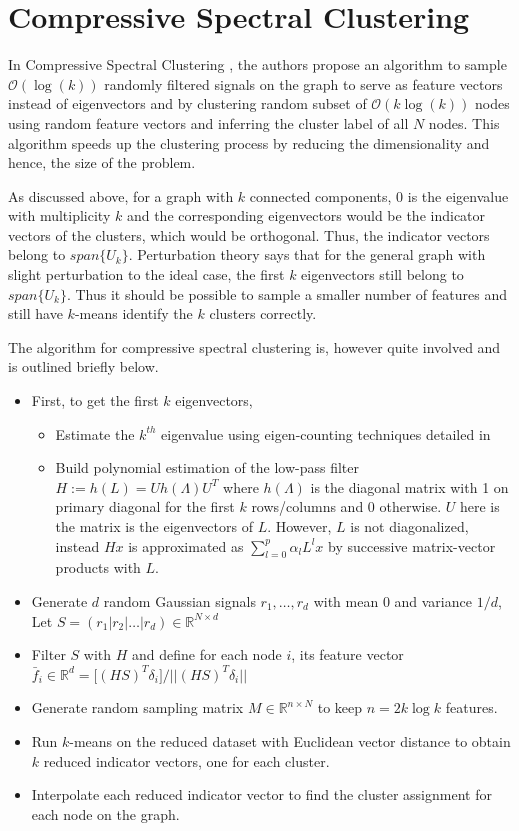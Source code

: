 \documentclass[10pt,a4paper, nocenter]{report}
\newcommand{\norm}[1]{\lvert\lvert {#1} \rvert\rvert}
\begin{document}
    \section{Compressive Spectral Clustering}
    In Compressive Spectral Clustering \cite{tremblay-compressive-SC-16}, the authors propose an algorithm to sample $\mathcal{O}(\log(k))$ randomly filtered signals on the graph to serve as feature vectors instead of eigenvectors and by clustering random subset of $\mathcal{O}(k\log(k))$ nodes using random feature vectors and inferring the cluster label of all $N$ nodes. This algorithm speeds up the clustering process by reducing the dimensionality and hence, the size of the problem.

    As discussed above, for a graph with $k$ connected components, 0 is the eigenvalue with multiplicity $k$ and the corresponding eigenvectors would be the indicator vectors of the clusters, which would be orthogonal. Thus, the indicator vectors belong to $span\{U_k\}$. Perturbation theory says that for the general graph with slight perturbation to the ideal case, the first $k$ eigenvectors still belong to $span\{U_k\}$. Thus it should be possible to sample a smaller number of features and still have $k$-means identify the $k$ clusters correctly. 

    The algorithm for compressive spectral clustering is, however quite involved and is outlined briefly below. 

    \begin{itemize}
        \item First, to get the first $k$ eigenvectors,  
            \begin{itemize}
            \item Estimate the $k^{th}$ eigenvalue using eigen-counting techniques detailed in \cite{Di13efficientestimation} 
            \item Build polynomial estimation of the low-pass filter $H := h(L) = U h(\Lambda) U^T$ where $h({\Lambda})$ is the diagonal matrix with 1 on primary diagonal for the first $k$ rows/columns and 0 otherwise. $U$ here is the matrix is the eigenvectors of $L$. However, $L$ is not diagonalized, instead $Hx$ is approximated as $\sum_{l=0}^{p}\alpha_l L^{l}x$ by successive matrix-vector products with $L$.
            \end{itemize}
        \item  Generate $d$ random Gaussian signals $r_1,\dots, r_d$ with mean $0$ and variance $1/d$, Let $S = (r_1|r_2|\dots|r_d) \in \mathbb{R}^{N\times d}$
        \item Filter $S$ with $H$ and define for each node $i$, its feature vector $\bar{f}_i \in \mathbb{R}^d = \big[ (HS)^T \delta_i \big] / \norm{(HS)^T \delta_i} $
        \item Generate random sampling matrix $M\in \mathbb{R}^{n\times N}$ to keep $n=2k \log{k}$ features. 
        \item Run $k$-means on the reduced dataset with Euclidean vector distance to obtain $k$ reduced indicator vectors, one for each cluster. 
        \item Interpolate each reduced indicator vector to find the cluster assignment for each node on the graph.
    \end{itemize}
\end{document}
